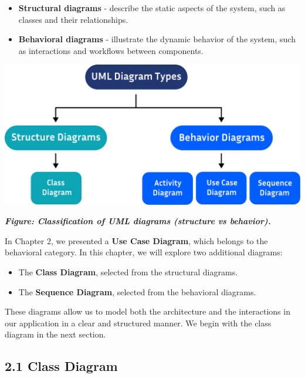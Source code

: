 \documentclass[12pt]{report}
\begin{document}
\begin{itemize}
	\item \textbf{Structural diagrams} - describe the static aspects of the system, such as classes and their relationships.
	\item \textbf{Behavioral diagrams} - illustrate the dynamic behavior of the system, such as interactions and workflows between components.
\end{itemize}

\begin{center}
	\vspace{1.5cm}
	\hspace{1cm}
	\includegraphics[width=14cm]{images/diagramType.pdf}

\end{center}
\begin{center}
	\textit{\textbf{Figure: Classification of UML diagrams (structure vs behavior).}}
\end{center}
\vspace{0.5cm}
\noindent In Chapter 2, we presented a \textbf{Use Case Diagram}, which belongs to the behavioral category. In this chapter, we will explore two additional diagrams:
\begin{itemize}
	\item The \textbf{Class Diagram}, selected from the structural diagrams.
	\item The \textbf{Sequence Diagram}, selected from the behavioral diagrams.
\end{itemize}

\noindent These diagrams allow us to model both the architecture and the interactions in our application in a clear and structured manner. We begin with the class diagram in the next section.

\subsection*{2.1 Class Diagram}
\end{document}
